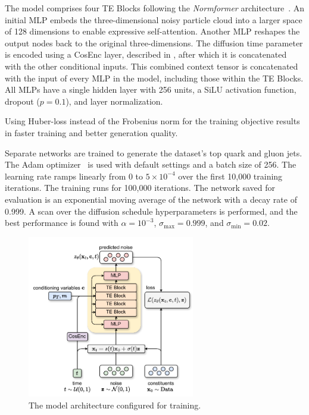 The model comprises four TE Blocks following the \textit{Normformer} architecture~\cite{Normformer}.
An initial MLP embeds the three-dimensional noisy particle cloud into a larger space of 128 dimensions to enable expressive self-attention.
Another MLP reshapes the output nodes back to the original three-dimensions.
The diffusion time parameter is encoded using a CosEnc layer, described in , after which it is concatenated with the other conditional inputs.
This combined context tensor is concatenated with the input of every MLP in the model, including those within the TE Blocks.
All MLPs have a single hidden layer with 256 units, a SiLU activation function, dropout ($p=0.1$), and layer normalization.

Using Huber-loss\cite{SmoothL1} instead of the Frobenius norm for the training objective results in faster training and better generation quality.

Separate networks are trained to generate the dataset's top quark and gluon jets.
The Adam optimizer~\cite{Adam} is used with default settings and a batch size of 256.
The learning rate ramps linearly from 0 to $5 \times 10^{-4}$ over the first 10,000 training iterations.
The training runs for 100,000 iterations.
The network saved for evaluation is an exponential moving average of the network with a decay rate of 0.999.
A scan over the diffusion schedule hyperparameters is performed, and the best performance is found with $\alpha=10^{-3}$, $\sigma_\text{max}=0.999$, and $\sigma_\text{min}=0.02$.

\begin{figure}
    \centering
    \includegraphics[width=0.65\textwidth]{Figures/jet_generation/pcjedi.pdf}
    \caption{The \pcjedi model architecture configured for training.}
    \label{fig:pcjedi}
\end{figure}

